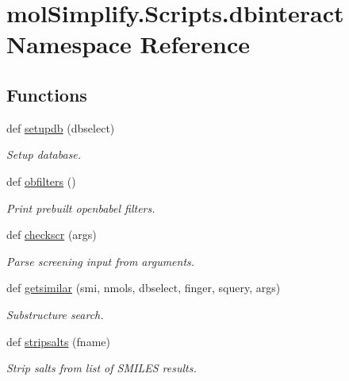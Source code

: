 \hypertarget{namespacemolSimplify_1_1Scripts_1_1dbinteract}{}\section{mol\+Simplify.\+Scripts.\+dbinteract Namespace Reference}
\label{namespacemolSimplify_1_1Scripts_1_1dbinteract}
\subsection*{Functions}
\begin{DoxyCompactItemize}
\item 
def \hyperlink{namespacemolSimplify_1_1Scripts_1_1dbinteract_abfa2f67547bce607376ee4c470a03365}{setupdb} (dbselect)
\begin{DoxyCompactList}\small\item\em Setup database. \end{DoxyCompactList}\item 
def \hyperlink{namespacemolSimplify_1_1Scripts_1_1dbinteract_ac94d292a78fcd04eb85787a6378d0d4d}{obfilters} ()
\begin{DoxyCompactList}\small\item\em Print prebuilt openbabel filters. \end{DoxyCompactList}\item 
def \hyperlink{namespacemolSimplify_1_1Scripts_1_1dbinteract_a5000fc00f49c30c6e563846fe531a959}{checkscr} (args)
\begin{DoxyCompactList}\small\item\em Parse screening input from arguments. \end{DoxyCompactList}\item 
def \hyperlink{namespacemolSimplify_1_1Scripts_1_1dbinteract_ae1b41b44ad2be286cff8e18f87e75dc8}{getsimilar} (smi, nmols, dbselect, finger, squery, args)
\begin{DoxyCompactList}\small\item\em Substructure search. \end{DoxyCompactList}\item 
def \hyperlink{namespacemolSimplify_1_1Scripts_1_1dbinteract_a3e69e497ffabc7e01ac66782b19bc542}{stripsalts} (fname)
\begin{DoxyCompactList}\small\item\em Strip salts from list of S\+M\+I\+L\+ES results. \end{DoxyCompactList}\item 

\end{DoxyCompactItemize}
